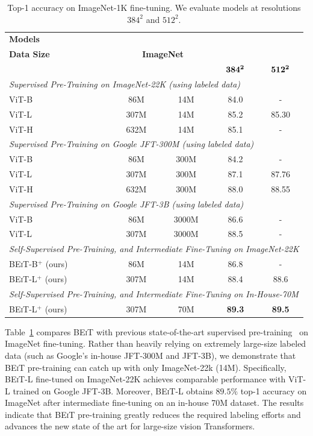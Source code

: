 \documentclass{article}
\newcommand\our{\textsc{BEiT}}
\begin{document}
\begin{table}[H]
\centering
\begin{tabular}{@{}lcccc}
\toprule
\multirow{2}{*}{\bf Models} & \multirowcell{2}{\bf Model \\ \bf Size} & \multirowcell{2}{\bf Labeled \\ \bf Data Size} &  \multicolumn{2}{c}{\bf ImageNet} \\
 & & & $\bf 384^2$ & $\bf 512^2$ \\ 
\midrule
\multicolumn{5}{l}{\textit{Supervised Pre-Training on ImageNet-22K (using labeled data)}} \\
ViT-B~\citep{vit} & 86M & 14M & 84.0 & - \\
ViT-L~\citep{vit} & 307M & 14M & 85.2 & 85.30 \\
ViT-H~\citep{vit} & 632M & 14M & 85.1 & - \\
\midrule
\multicolumn{5}{l}{\textit{Supervised Pre-Training on Google JFT-300M (using labeled data)}} \\
ViT-B~\citep{vit} & 86M & 300M & 84.2 & - \\
ViT-L~\citep{vit} & 307M & 300M & 87.1 & 87.76 \\
ViT-H~\citep{vit} & 632M & 300M & 88.0 & 88.55 \\
\midrule
\multicolumn{5}{l}{\textit{Supervised Pre-Training on Google JFT-3B (using labeled data)}} \\
ViT-B~\citep{scaling:vit} & 86M & 3000M & 86.6 & - \\
ViT-L~\citep{scaling:vit} & 307M & 3000M & 88.5 & - \\
\midrule
\multicolumn{5}{l}{\textit{Self-Supervised Pre-Training, and Intermediate Fine-Tuning on ImageNet-22K}} \\
\our{}-B$^+$ (ours) & 86M & 14M & 86.8 & - \\
\our{}-L$^+$ (ours) & 307M & 14M & 88.4 & 88.6 \\
\midrule
\multicolumn{5}{l}{\textit{Self-Supervised Pre-Training, and Intermediate Fine-Tuning on In-House-70M}} \\
\our{}-L$^+$ (ours) & 307M & 70M & \bf 89.3 & \bf 89.5 \\
\bottomrule
\end{tabular}
\caption{Top-1 accuracy on ImageNet-1K fine-tuning.
We evaluate models at resolutions $384^2$ and $512^2$.
}
\label{tbl:supervised:pt:cls}
\end{table}


Table~\ref{tbl:supervised:pt:cls} compares \our{} with previous state-of-the-art supervised pre-training~\citep{vit,scaling:vit} on ImageNet fine-tuning.
Rather than heavily relying on extremely large-size labeled data (such as Google's in-house JFT-300M and JFT-3B), we demonstrate that \our{} pre-training can catch up with only ImageNet-22k (14M).
Specifically, \our{}-L fine-tuned on ImageNet-22K achieves comparable performance with ViT-L trained on Google JFT-3B.
Moreover, \our{}-L obtains $89.5\%$ top-1 accuracy on ImageNet after intermediate fine-tuning on an in-house 70M dataset.
The results indicate that \our{} pre-training greatly reduces the required labeling efforts and advances the new state of the art for large-size vision Transformers.
\end{document}
